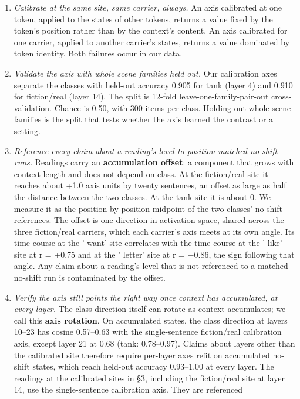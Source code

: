 \documentclass[11pt]{article}
\begin{document}
\begin{enumerate}
\item \emph{Calibrate at the same site, same carrier, always.} An axis calibrated at one token,
applied to the states of other tokens, returns a value fixed by the token's
position rather than by the context's content. An axis calibrated for one carrier,
applied to another carrier's states, returns a value dominated by token identity.
Both failures occur in our data.
\item \emph{Validate the axis with whole scene families held out.} Our calibration axes
separate the classes with held-out accuracy 0.905 for tank (layer 4) and 0.910 for
fiction/real (layer 14). The split is 12-fold leave-one-family-pair-out
cross-validation. Chance is 0.50, with 300 items per class. Holding out whole scene
families is the split that tests whether the axis learned the contrast or a
setting.
\item \emph{Reference every claim about a reading's level to position-matched no-shift runs.}
Readings carry an \textbf{accumulation offset}: a component that grows with context
length and does not depend on class. At the fiction/real site it reaches about
+1.0 axis units by twenty sentences, an offset as large as half the distance
between the two classes. At the tank site it is about 0. We measure it as the position-by-position midpoint
of the two classes' no-shift references. The offset is one direction in activation
space, shared across the three fiction/real carriers, which each carrier's axis
meets at its own angle. Its time course at the ' want' site correlates with the
time course at the ' like' site at r = +0.75 and at the ' letter' site at
r = $-$0.86, the sign following that angle. Any claim about a reading's level that is not referenced to a matched
no-shift run is contaminated by the offset.
\item \emph{Verify the axis still points the right way once context has accumulated, at
every layer.} The class direction itself can rotate as context accumulates; we call this
\textbf{axis rotation}. On accumulated states, the class direction at layers 10–23 has
cosine 0.57–0.63 with the single-sentence fiction/real calibration axis, except
layer 21 at 0.68 (tank: 0.78–0.97). Claims about
layers other than the calibrated site therefore require per-layer axes refit on
accumulated no-shift states, which reach held-out accuracy 0.93–1.00 at every
layer. The readings at the calibrated sites in \S3, including the fiction/real site
at layer 14, use the single-sentence calibration axis. They are referenced

\end{enumerate}
\end{document}
